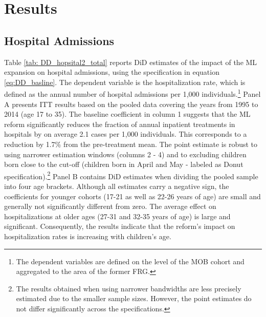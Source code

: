 \documentclass[11pt, a4paper, draft]{article} %
\begin{document}














\section{Results}\label{sec:results}

\subsection{Hospital Admissions}


Table \ref{tab: DD_hopsital2_total} reports DiD estimates of the impact of the ML expansion on hospital admissions, using the specification in equation \ref{eq:DD_basline}. The dependent variable is the hospitalization rate, which is defined as the annual number of hospital admissions per 1,000 individuals.\footnote{The dependent variables are defined on the level of the MOB cohort and aggregated to the area of the former FRG.} Panel A presents ITT results based on the pooled data covering the years from 1995 to 2014 (age 17 to 35). The baseline coefficient in column 1 suggests that the ML reform significantly reduces the fraction of annual inpatient treatments in hospitals by on average 2.1 cases per 1,000 individuals. This corresponds to a reduction by 1.7\% from the pre-treatment mean. The point estimate is robust to using narrower estimation windows (columns 2 - 4) and to excluding children born close to the cut-off (children born in April and May - labeled as Donut specification).\footnote{The results obtained when using narrower bandwidths are less precisely estimated due to the smaller sample sizes. However, the point estimates do not differ significantly across the specifications.} Panel B contains DiD estimates when dividing the pooled sample into four age brackets. Although all estimates carry a negative sign, the coefficients for younger cohorts (17-21 as well as 22-26 years of age) are small and generally not significantly different from zero. The average effect on hospitalizations at older ages (27-31 and 32-35 years of age) is large and significant. Consequently, the results indicate that the reform's impact on hospitalization rates is increasing with children's age.
\end{document}

